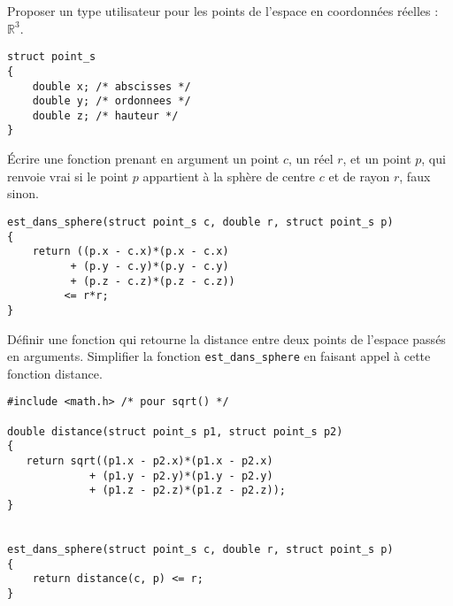 \begin{lastenu}
\item Proposer un type utilisateur pour les points de l'espace
  en coordonnées réelles : $\mathbb{R}^3$.
  \begin{correction}
\begin{verbatim}
struct point_s
{
    double x; /* abscisses */
    double y; /* ordonnees */
    double z; /* hauteur */
}
\end{verbatim}
\end{correction}

\item Écrire une fonction  prenant en argument un
  point $c$, un réel $r$, et un point $p$, qui
  renvoie vrai si le point $p$ appartient à la sphère de centre $c$ et
  de rayon $r$, faux sinon.
  \begin{correction}
\begin{verbatim}
est_dans_sphere(struct point_s c, double r, struct point_s p)
{
    return ((p.x - c.x)*(p.x - c.x) 
          + (p.y - c.y)*(p.y - c.y)  
          + (p.z - c.z)*(p.z - c.z)) 
         <= r*r;
}
\end{verbatim}

\end{correction}
\item Définir une fonction  qui retourne la distance entre
  deux points de l'espace passés en arguments. Simplifier la fonction
  \verb|est_dans_sphere| en faisant appel à cette fonction distance.
\begin{correction}
\begin{verbatim}
#include <math.h> /* pour sqrt() */

double distance(struct point_s p1, struct point_s p2)
{
   return sqrt((p1.x - p2.x)*(p1.x - p2.x) 
             + (p1.y - p2.y)*(p1.y - p2.y)  
             + (p1.z - p2.z)*(p1.z - p2.z));
}


est_dans_sphere(struct point_s c, double r, struct point_s p)
{
    return distance(c, p) <= r;
}
\end{verbatim}
\end{correction}


\end{lastenu}
